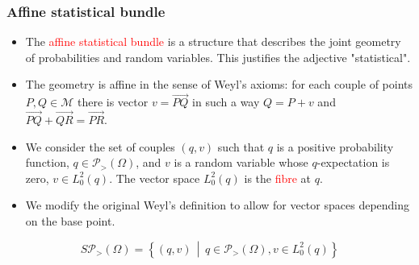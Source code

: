 \documentclass[xcolor=svgnames]{beamer}
\newcommand{\model}{\mathcal M}
\newcommand{\opensimplexon}[1]{\mathcal P_>\left(#1\right)}
\newcommand{\rosso}[1]{\textcolor{red}{#1}}
\newcommand{\setof}[2]{\left\{#1 \, \middle| \, #2 \right\}}
\renewcommand{\emph}{\rosso}
\begin{document}
\begin{frame}\small\frametitle{Affine statistical bundle}
\begin{itemize}
    \item The \emph{affine statistical bundle} is a structure that describes the joint geometry of probabilities and random variables. This justifies the adjective "statistical".
\item The geometry is affine in the sense of Weyl's axioms: for each couple of points $P, Q \in \model$ there is vector $v = \overrightarrow{PQ}$ in such a way $Q = P+v$ and $\overrightarrow{PQ}+\overrightarrow{QR}=\overrightarrow{PR}$. 

\item We consider the set of couples $(q,v)$ such that $q$ is a positive probability function, $q \in \opensimplexon \Omega$, and $v$ is a random variable whose $q$-expectation is zero, $v \in L^2_0(q)$. The vector space $L_0^2(q)$ is the \emph{fibre} at $q$.

\item We modify the original Weyl's definition to allow for vector spaces depending on the base point.
\end{itemize} 

\begin{definition}
    \begin{equation*}
        S\opensimplexon \Omega = \setof{(q,v)}{q \in \opensimplexon \Omega, v \in L^2_0(q)}
    \end{equation*}
\end{definition}
\end{frame}
\end{document}
